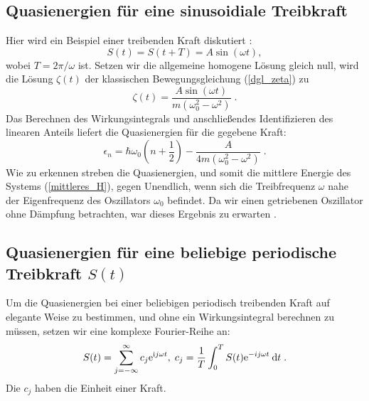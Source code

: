   \subsection{Quasienergien für eine sinusoidiale Treibkraft}
    Hier wird ein Beispiel einer treibenden Kraft diskutiert \cite{haengi}:
    \begin{equation}
      S(t) = S(t+T) = A\sin(\omega t),
    \end{equation}
    wobei $T=2\pi / \omega$ ist.
    Setzen wir die allgemeine homogene Lösung gleich null, wird die Lösung $\zeta(t)$ der klassischen Bewegungsgleichung (\ref{dgl_zeta}) zu \cite{mads}
    \begin{equation}
      \zeta(t) = \frac{A\sin(\omega t)}{m(\omega_0^2 - \omega^2)} \; .
    \end{equation}
    Das Berechnen des Wirkungsintegrals und anschließendes Identifizieren des linearen Anteils liefert die Quasienergien für die gegebene Kraft:
    \begin{equation}
      \epsilon_n  = \hbar \omega_0\left(n+\frac{1}{2}\right) - \frac{A}{4m(\omega_0^2-\omega^2)} \;.
    \end{equation}
    Wie zu erkennen streben die Quasienergien, und somit die mittlere Energie des Systems (\ref{mittleres_H}), gegen Unendlich, wenn sich die Treibfrequenz $\omega$ nahe der Eigenfrequenz des Oszillators $\omega_0 $ befindet.
    Da wir einen getriebenen Oszillator ohne Dämpfung betrachten, war dieses Ergebnis zu erwarten \cite{mads}.


\subsection{Quasienergien für eine beliebige periodische Treibkraft $S(t)$}
  \label{epsilon_bel_kraft}
  Um die Quasienergien bei einer beliebigen periodisch treibenden Kraft auf elegante Weise zu bestimmen, und ohne ein Wirkungsintegral berechnen zu müssen, setzen wir eine komplexe Fourier-Reihe an:
  \begin{equation}
    S(t) = \sum_{j=-\infty}^\infty c_j \text e^{\text ij\omega t}, \; c_j = \frac{1}{T} \int_0^T S(t) \text e^{-ij\omega t} \: \text d t \; .
  \end{equation}
  Die $c_j$ haben die Einheit einer Kraft.

